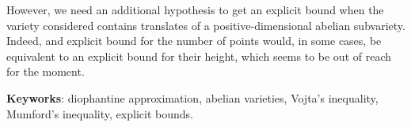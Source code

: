 \documentclass[final, cover]{mpg-preth}
\begin{document}
However, we need an additional hypothesis to get an explicit bound when the
variety considered contains translates of a positive-dimensional abelian
subvariety. Indeed, and explicit bound for the number of points would, in some
cases, be equivalent to an explicit bound for their height, which seems to be
out of reach for the moment.

\medskip\noindent
\textbf{Keyworks}: diophantine approximation, abelian varieties, Vojta's
inequality, \mbox{Mumford}'s inequality, explicit bounds.
\end{document}

